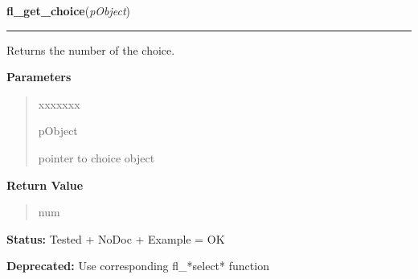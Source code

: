 \hspace{.8\funcindent}\begin{boxedminipage}{\funcwidth}

    \raggedright \textbf{fl\_get\_choice}(\textit{pObject})

    \vspace{-1.5ex}

    \rule{\textwidth}{0.5\fboxrule}
\setlength{\parskip}{2ex}
    Returns the number of the choice.

\setlength{\parskip}{1ex}
      \textbf{Parameters}
      \vspace{-1ex}

      \begin{quote}
        \begin{Ventry}{xxxxxxx}

          \item[pObject]

          pointer to choice object

        \end{Ventry}

      \end{quote}

      \textbf{Return Value}
    \vspace{-1ex}

      \begin{quote}
      num

      \end{quote}

\textbf{Status:} Tested + NoDoc + Example = OK



\textbf{Deprecated:} Use corresponding fl\_*select* function



    \end{boxedminipage}

    \label{xformslib:deprecated:fl_get_choice_item_text}

    \vspace{0.5ex}

